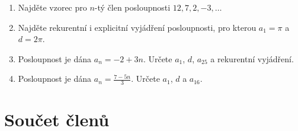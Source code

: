 \documentclass[11pt,a4paper]{article}
\begin{document}
\begin{enumerate}[resume]
    \item Najděte vzorec pro $n$-tý člen posloupnosti $12, 7, 2, -3,\ldots$

    \item Najděte rekurentní i explicitní vyjádření posloupnosti, pro kterou $a_1=\pi$ a $d=2\pi$.

    \item Posloupnost je dána $a_n=-2+3n$. Určete $a_1$, $d$, $a_{25}$ a rekurentní vyjádření.

    \item Posloupnost je dána $a_n=\frac{7-5n}{3}$. Určete $a_1$, $d$ a $a_{16}$.
\end{enumerate}

\section*{Součet členů}
\end{document}
